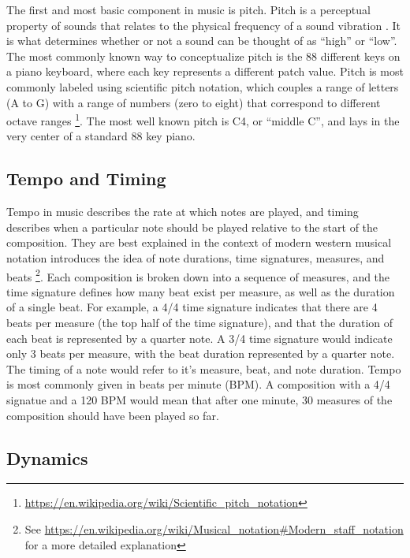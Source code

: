 \begin{appendices}
The first and most basic component in music is pitch. Pitch is a perceptual property of sounds that relates to the physical frequency of a sound vibration \cite{klapuri2006introduction}. It is what determines whether or not a sound can be thought of as ``high'' or ``low''. The most commonly known way to conceptualize pitch is the 88 different keys on a piano keyboard, where each key represents a different patch value. Pitch is most commonly labeled using scientific pitch notation, which couples a range of letters (A to G) with a range of numbers (zero to eight) that correspond to different octave ranges \footnote{\url{https://en.wikipedia.org/wiki/Scientific_pitch_notation}}. The most well known pitch is C4, or ``middle C'', and lays in the very center of a standard 88 key piano. 

\subsection{Tempo and Timing}

Tempo in music describes the rate at which notes are played, and timing describes when a particular note should be played relative to the start of the composition. They are best explained in the context of modern western musical notation introduces the idea of note durations, time signatures, measures, and beats \footnote{See \url{https://en.wikipedia.org/wiki/Musical_notation\#Modern_staff_notation} for a more detailed explanation}.  Each composition is broken down into a sequence of measures, and the time signature defines how many beat exist per measure, as well as the duration of a single beat. For example, a 4/4 time signature indicates that there are 4 beats per measure (the top half of the time signature), and that the duration of each beat is represented by a quarter note. A 3/4 time signature would indicate only 3 beats per measure, with the beat duration represented by a quarter note. The timing of a note would refer to it's measure, beat, and note duration. Tempo is most commonly given in beats per minute (BPM). A composition with a 4/4 signatue and a 120 BPM would mean that after one minute, 30 measures of the composition should have been played so far. 

\subsection{Dynamics}


\end{appendices}
